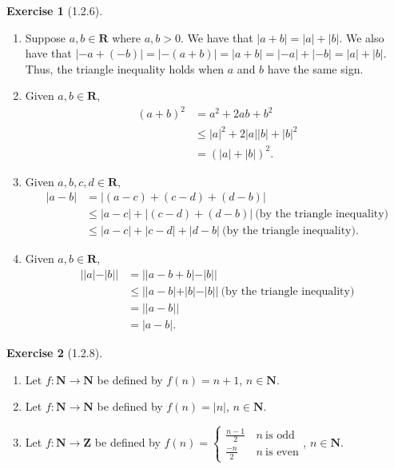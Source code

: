 \documentclass{amsart}
\theoremstyle{definition}
\newtheorem{exercise}{Exercise}
\newcommand{\N}{\mathbf{N}}
\newcommand{\Z}{\mathbf{Z}}
\newcommand{\R}{\mathbf{R}}
\newcommand{\abs}[1]{|#1|}
\begin{document}
\begin{exercise}[1.2.6]
  \begin{enumerate}[label={(\alph*)}]
    \item Suppose $a, b \in \R$ where $a, b > 0$. We have that $\abs{a + b} =
      \abs{a} + \abs{b}$.  We also have that $\abs{-a + (-b)} = \abs{-(a + b)} =
      \abs{a + b} = \abs{-a} + \abs{-b} = \abs{a} + \abs{b}$. Thus, the triangle
      inequality holds when $a$ and $b$ have the same sign.
    \item Given $a, b \in \R$,
      \begin{align*}
        {(a + b)}^2 &= a^2 + 2ab + b^2 \\
        &\le \abs{a}^2 + 2\abs{a}\abs{b} + \abs{b}^2 \\
        &= {(\abs{a} + \abs{b})}^2.
      \end{align*}
    \item Given $a, b, c, d \in \R$,
      \begin{align*}
        \abs{a - b} &= \abs{(a - c) + (c - d) + (d - b)} \\
        &\le \abs{a - c} + \abs{(c - d) + (d - b)}\ \text{(by the triangle
        inequality)} \\
        &\le \abs{a - c} + \abs{c - d} + \abs{d - b}\ \text{(by the triangle
        inequality)}.
      \end{align*}
    \item Given $a, b \in \R$,
      \begin{align*}
        \abs{\abs{a} - \abs{b}} &= \abs{\abs{a - b + b} - \abs{b}} \\
        &\le \abs{\abs{a - b} + \abs{b} - \abs{b}}\ \text{(by the triangle
        inequality)} \\
        &= \abs{\abs{a - b}} \\
        &= \abs{a - b}.
      \end{align*}
  \end{enumerate}
\end{exercise}

\begin{exercise}[1.2.8]
  \begin{enumerate}[label={(\alph*)}]
    \item Let $f : \N \rightarrow \N$ be defined by $f(n) = n + 1$, $n \in \N$.
    \item Let $f : \N \rightarrow \N$ be defined by $f(n) = \abs{n}$, $n \in \N$.
    \item Let $f : \N \rightarrow \Z$ be defined by $f(n) =
      \begin{cases}
        \frac{n - 1}{2} &\, n\ \text{is odd} \\
        \frac{-n}{2} &\, n\ \text{is even}
      \end{cases}$,
      $n \in \N$.
  \end{enumerate}
\end{exercise}
\end{document}
